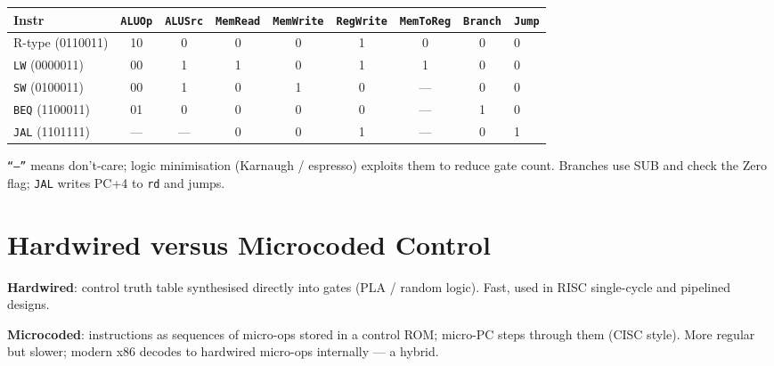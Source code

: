 \begin{center}
\begin{tabular}{lcccccccl}
\toprule Instr & \texttt{ALUOp} & \texttt{ALUSrc} & \texttt{MemRead} & \texttt{MemWrite} & \texttt{RegWrite} & \texttt{MemToReg} & \texttt{Branch} & \texttt{Jump}\\ \midrule
R-type (0110011) & 10 & 0 & 0 & 0 & 1 & 0 & 0 & 0 \\
\texttt{LW} (0000011) & 00 & 1 & 1 & 0 & 1 & 1 & 0 & 0 \\
\texttt{SW} (0100011) & 00 & 1 & 0 & 1 & 0 & --- & 0 & 0 \\
\texttt{BEQ} (1100011) & 01 & 0 & 0 & 0 & 0 & --- & 1 & 0 \\
\texttt{JAL} (1101111) & --- & --- & 0 & 0 & 1 & --- & 0 & 1 \\ \bottomrule
\end{tabular}
\end{center}

\texttt{``---''} means don't-care; logic minimisation (Karnaugh / espresso) exploits them to reduce gate count.
Branches use SUB and check the Zero flag; \texttt{JAL} writes PC+4 to \texttt{rd} and jumps.

\section{Hardwired versus Microcoded Control}
\textbf{Hardwired}: control truth table synthesised directly into gates (PLA / random logic). Fast, used in RISC single-cycle and pipelined designs.

\textbf{Microcoded}: instructions as sequences of micro-ops stored in a control ROM; micro-PC steps through them (CISC style). More regular but slower; modern x86 decodes to hardwired micro-ops internally --- a hybrid.

\begin{center}
\end{center}

